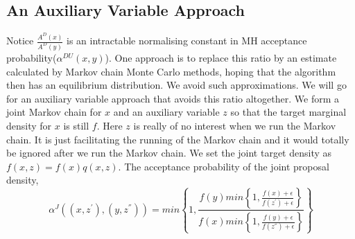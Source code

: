 \documentclass{article}
\begin{document}
\subsection{An Auxiliary Variable Approach}
Notice $\frac{A^{D}(x)}{A^{D}(y)}$ is an intractable  normalising constant in MH acceptance probability($\alpha^{DU}(x,y)$). One approach is to replace this ratio by an estimate calculated by Markov chain Monte Carlo methods, hoping that the algorithm then has an equilibrium distribution. We avoid such approximations. We will go for an auxiliary variable approach that avoids this ratio altogether. We form a joint Markov chain for $x$ and an auxiliary variable $z$ so that the target marginal density for $x$ is still $f$. Here $z$ is really of no interest when we run the Markov chain. It is just facilitating the running of the Markov chain and it would totally be ignored after we run the Markov chain. We set the joint target density as $f(x,z)=f(x)q(x,z)$. The acceptance probability of the joint proposal density,
\begin{equation*}
    \alpha^{J}((x,z^{'}),(y,z^{''}))= min\left\{1,\frac{f(y)min\left\{1,\frac{f(x)+\epsilon}{f(z^{'})+\epsilon}\right\}}{f(x)min\left\{1,\frac{f(y)+\epsilon}{f(z^{''})+\epsilon}\right\}}\right\}
\end{equation*}
\end{document}

